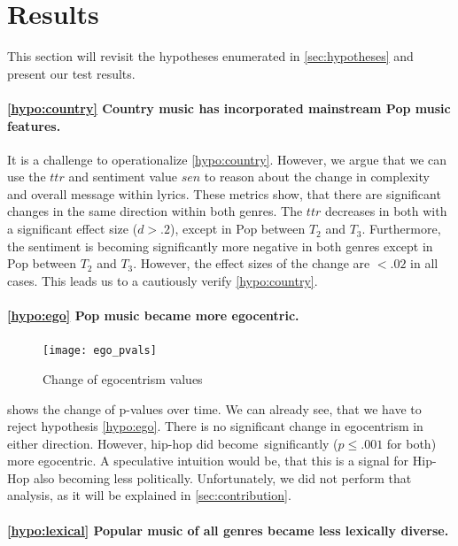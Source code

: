 \documentclass[11pt,a4paper]{article}
\begin{document}

\section{Results}\label{sec:results}

This section will revisit the hypotheses enumerated in \cref{sec:hypotheses} and present our test results. 
\paragraph{\ref{hypo:country} Country music has incorporated mainstream Pop music features.}

It is a challenge to operationalize \ref{hypo:country}. However, we argue that we can use the $ttr$ and sentiment value $sen$ to reason about the change in complexity and overall message within lyrics. These metrics show, that there are significant changes in the same direction within both genres. The $ttr$ decreases in both with a significant effect size ($d > .2$), except in Pop between $T_2$ and $T_3$. Furthermore, the sentiment is becoming significantly more negative in both genres except in Pop between $T_2$ and $T_3$. However, the effect sizes of the change are $<.02$ in all cases. This leads us to a cautiously verify \ref{hypo:country}. 

\paragraph{\ref{hypo:ego} Pop music became more egocentric.}
\begin{figure}
	\texttt{[image: ego\_pvals]}
	\caption{Change of egocentrism values}
	\label{fig:pvals:ego}
\end{figure}

 shows the change of p-values over time. We can already see, that we have to reject hypothesis \ref{hypo:ego}. There is no significant change in egocentrism in either direction. However, hip-hop did become significantly ($p \leq .001$ for both) more egocentric. A speculative intuition would be, that this is a signal for Hip-Hop also becoming less politically. Unfortunately, we did not perform that analysis, as it will be explained in \cref{sec:contribution}. 

\paragraph{\ref{hypo:lexical} Popular music of all genres became less lexically diverse.}
\end{document}
